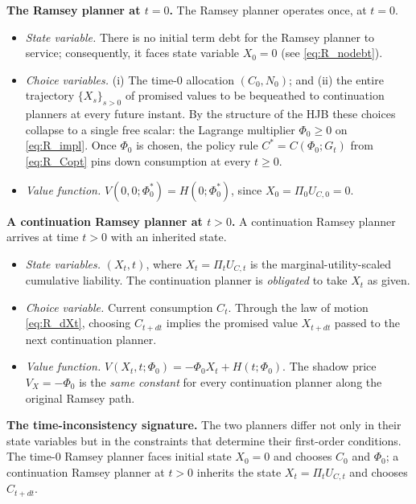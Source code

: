 \documentclass[12pt]{article}
\begin{document}
\medskip
\noindent\textbf{The Ramsey planner at $t=0$.}
The Ramsey planner operates once, at $t=0$.
\begin{itemize}
  \item \emph{State variable.} There is no initial term debt for the Ramsey planner to service;
    consequently, it faces state variable $X_0 = 0$ (see
    \eqref{eq:R_nodebt}).
  \item \emph{Choice variables.}  (i) The time-$0$ allocation $(C_0, N_0)$;
    and (ii) the entire trajectory $\{X_s\}_{s>0}$ of promised values to be
    bequeathed to continuation planners at every future instant.  By the
    structure of the HJB these choices collapse to a single free scalar:
    the Lagrange multiplier $\Phi_0\ge 0$ on \eqref{eq:R_impl}.  Once
    $\Phi_0$ is chosen, the policy rule $C^* = C(\Phi_0; G_t)$ from
    \eqref{eq:R_Copt} pins down consumption at every $t\ge 0$.
  \item \emph{Value function.}  $ V(0,0;\Phi_0^*) = H(0;\Phi_0^*)$,
    since $X_0 = \Pi_0 U_{C,0} = 0$.
\end{itemize}

\medskip
\noindent\textbf{A continuation Ramsey planner at $t>0$.}
A continuation Ramsey planner arrives at time $t>0$ with an
inherited state.  
\begin{itemize}
  \item \emph{State variables.} $(X_t, t)$, where $X_t = \Pi_t U_{C,t}$ is
    the marginal-utility-scaled cumulative liability.  The continuation
    planner is \emph{obligated} to take $X_t$ as given.
  \item \emph{Choice variable.}  Current consumption $C_t$.  Through the law
    of motion \eqref{eq:R_dXt}, choosing $C_{t+dt}$ implies the promised value
    $X_{t+dt}$ passed to the next continuation planner.
  \item \emph{Value function.}  $V(X_t, t;\Phi_0) = -\Phi_0 X_t + H(t;\Phi_0)$.
    The shadow price $V_X = -\Phi_0$ is the \emph{same constant} for every
    continuation planner along the original Ramsey path.
\end{itemize}

\medskip
\noindent\textbf{The time-inconsistency signature.}
The two planners differ not only in their state variables but in the constraints
that determine their first-order conditions.  The time-$0$ Ramsey planner
faces initial state $X_0 = 0$ and  chooses $C_0$ and $\Phi_0$; a continuation Ramsey
planner at $t>0$ inherits the state $X_t = \Pi_t U_{C,t}$ and chooses $C_{t+ dt}$. 
\end{document}
